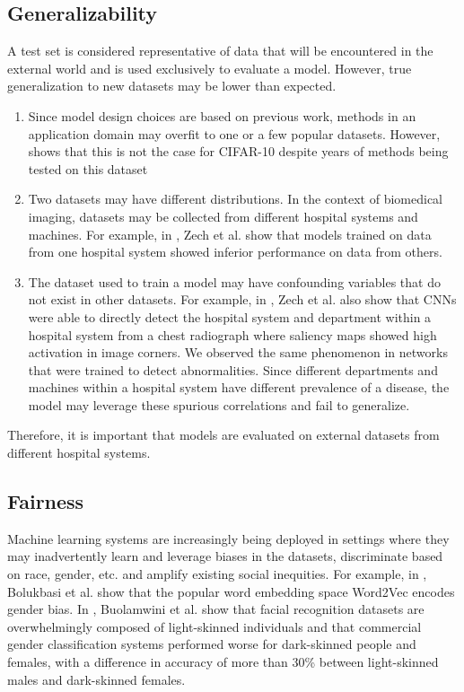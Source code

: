 \documentclass[12pt,oneside,a4paper]{report}
\begin{document}
\subsection{Generalizability}
A test set is considered representative of data that will be encountered in the
external world and is used exclusively to evaluate a model. However, true
generalization to new datasets may be lower than expected.
\begin{enumerate}
\item{Since model design choices are based on previous work, methods in an
    application domain may overfit to one or a few popular datasets. However,
    \cite{recht2018cifar} shows that this is not the case for CIFAR-10 despite
    years of methods being tested on this dataset}
\item{Two datasets may have different distributions. In the context of
    biomedical imaging, datasets may be collected from different hospital
    systems and machines. For example, in \cite{zech2018variable}, Zech et al.
    show that models trained on data from one hospital system showed inferior
    performance on data from others.}
\item{The dataset used to train a model may have confounding variables that do
    not exist in other datasets. For example, in \cite{zech2018variable}, Zech
    et al. also show that CNNs were able to directly detect the hospital system
    and department within a hospital system from a chest radiograph where
    saliency maps showed high activation in image corners. We observed the same
    phenomenon in networks that were trained to detect abnormalities. Since
    different departments and machines within a hospital system have different
    prevalence of a disease, the model may leverage these spurious correlations
    and fail to generalize.}
\end{enumerate}
Therefore, it is important that models are evaluated on external datasets from
different hospital systems.

\subsection{Fairness}
Machine learning systems are increasingly being deployed in settings where they
may inadvertently learn and leverage biases in the datasets, discriminate based
on race, gender, etc. and amplify existing social inequities. For example, in
\cite{bolukbasi2016man}, Bolukbasi et al. show that the popular word embedding
space Word2Vec encodes gender bias. In \cite{buolamwini2018gender}, Buolamwini
et al. show that facial recognition datasets are overwhelmingly composed of
light-skinned individuals and that commercial gender classification systems
performed worse for dark-skinned people and females, with a difference in
accuracy of more than 30\% between
light-skinned males and dark-skinned females.\\
\end{document}
